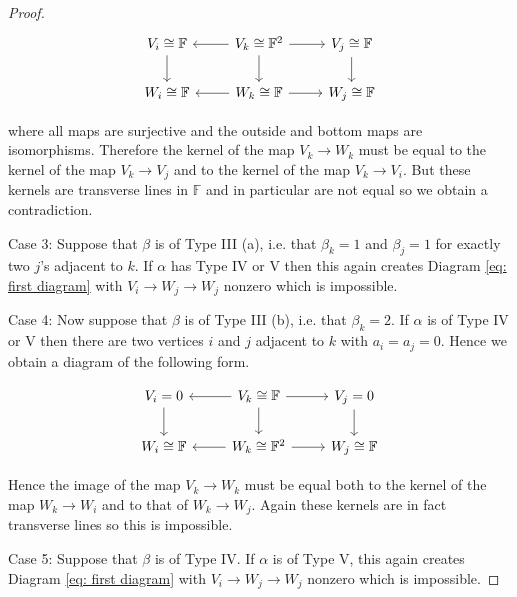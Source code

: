 \documentclass[10pt,a4paper]{amsart}
\begin{document}
\begin{proof}
\begin{equation}\label{eq: second diagram}
\begin{tikzcd}
V_i \cong \mathbb{F} \arrow[d]  & V_k \cong \mathbb{F}^2 \arrow[l]  \arrow[d] \arrow[r] & V_j \cong \mathbb{F} \arrow[d]  
\\ W_i \cong \mathbb{F} & W_k \cong \mathbb{F} \arrow[l] \arrow[r]  & W_j \cong \mathbb{F}
\end{tikzcd}
\end{equation}

where all maps are surjective and the outside and bottom maps are isomorphisms. Therefore the kernel of the map $V_k \to W_k$ must be equal to the kernel of the map $V_k \to V_j$ and to the kernel of the map $V_k \to V_i$. But these kernels are transverse lines in $\mathbb{F}$ and in particular are not equal so we obtain a contradiction. 

Case 3: Suppose that $\beta$ is of Type III (a), i.e. that $\beta_k=1$ and $\beta_j=1$ for exactly two $j$'s adjacent to $k$. If $\alpha$ has Type IV or V then this again creates Diagram \ref{eq: first diagram} with $V_i \to W_j \to W_j$ nonzero which is impossible.

Case 4: Now suppose that $\beta$ is of Type III (b), i.e. that $\beta_k = 2$. If $\alpha$ is of Type IV or V then there are two vertices $i$ and $j$ adjacent to $k$ with $a_i = a_j = 0$. Hence we obtain a diagram of the following form. 

\begin{equation}\label{eq: two zeros mapping to thick}
\begin{tikzcd}
V_i = 0 \arrow[d]  & V_k \cong \mathbb{F} \arrow[l]  \arrow[d] \arrow[r] & V_j = 0 \arrow[d]  
\\ W_i \cong \mathbb{F} & W_k \cong \mathbb{F}^2 \arrow[l] \arrow[r]  & W_j \cong \mathbb{F}
\end{tikzcd}
\end{equation}


Hence the image of the map $V_k \to W_k$ must be equal both to the kernel of the map $W_k \to W_i$ and to that of $W_k \to W_j$. Again these kernels are in fact transverse lines so this is impossible.  

Case 5: Suppose that $\beta$ is of Type IV. If $\alpha$ is of Type V, this again creates Diagram \ref{eq: first diagram} with $V_i \to W_j \to W_j$ nonzero which is impossible.


\end{proof}
\end{document}
